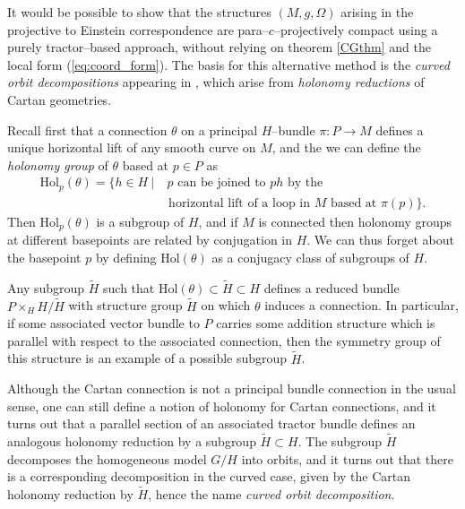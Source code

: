 It would be possible to show that the structures $(M,g,\Omega)$ arising in the projective to Einstein correspondence are para--$c$--projectively compact using a purely tractor--based approach, without relying on theorem \ref{CGthm} and the local form (\ref{eq:coord_form}). The basis for this alternative method is the \textit{curved orbit decompositions} appearing in \cite{CGH-duke}, which arise from \textit{holonomy reductions} of Cartan geometries.

Recall first that a connection $\theta$ on a principal $H$--bundle $\pi:P\rightarrow M$ defines a unique horizontal lift of any smooth curve on $M$, and the we can define the \textit{holonomy group} of $\theta$ based at $p\in P$ as
\begin{align*}
\mathrm{Hol}_p(\theta)=\{h\in H\ |&\ p\mbox{ can be joined to }ph\mbox{ by the}\\
&\mbox{ horizontal lift of a loop in }M\mbox{ based at }\pi(p)\}.
\end{align*}
Then $\mathrm{Hol}_p(\theta)$ is a subgroup of $H$, and if $M$ is connected then holonomy groups at different basepoints are related by conjugation in $H$. We can thus forget about the basepoint $p$ by defining $\mathrm{Hol}(\theta)$ as a conjugacy class of subgroups of $H$.

Any subgroup $\tilde{H}$ such that $\mathrm{Hol}(\theta)\subset \tilde{H}\subset H$ defines a reduced bundle $P\times_H H/\tilde{H}$ with structure group $\tilde{H}$ on which $\theta$ induces a connection. In particular, if some associated vector bundle to $P$ carries some addition structure which is parallel with respect to the associated connection, then the symmetry group of this structure is an example of a possible subgroup $\tilde{H}$.

Although the Cartan connection is not a principal bundle connection in the usual sense, one can still define a notion of holonomy for Cartan connections, and it turns out \cite{CGH-duke} that a parallel section of an associated tractor bundle defines an analogous holonomy reduction by a subgroup $\tilde{H}\subset H$. The subgroup $\tilde{H}$ decomposes the homogeneous model $G/H$ into orbits, and it turns out that there is a corresponding decomposition in the curved case, given by the Cartan holonomy reduction by $\tilde{H}$, hence the name \textit{curved orbit decomposition}. 

